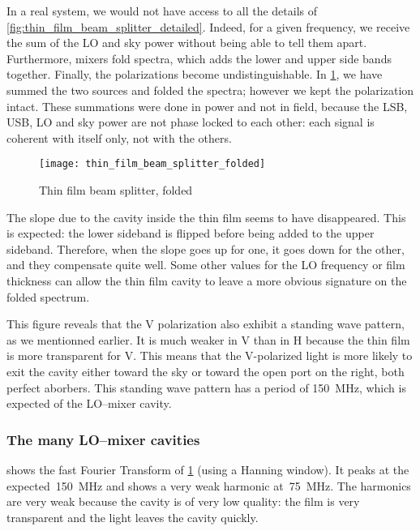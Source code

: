 In a real system, we would not have access to all the details of \cref{fig:thin_film_beam_splitter_detailed}.
Indeed, for a given frequency, we receive the sum of the LO and sky power without being able to tell them apart.
Furthermore, mixers fold spectra, which adds the lower and upper side bands together.
Finally, the polarizations become undistinguishable.
In \cref{fig:thin_film_beam_splitter_folded}, we have summed the two sources and folded the spectra; however we kept the polarization intact.
These summations were done in power and not in field, because the LSB, USB, LO and sky power are not phase locked to each other: each signal is coherent with itself only, not with the others.

\begin{figure}[hbtp]
    \centering
    \texttt{[image: thin\_film\_beam\_splitter\_folded]}
    \caption{Thin film beam splitter, folded}
    \label{fig:thin_film_beam_splitter_folded}
\end{figure}

The slope due to the cavity inside the thin film seems to have disappeared.
This is expected: the lower sideband is flipped before being added to the upper sideband.
Therefore, when the slope goes up for one, it goes down for the other,
and they compensate quite well.
Some other values for the LO frequency or film thickness can allow the thin film cavity to leave a more obvious signature on the folded spectrum.

This figure reveals that the V polarization also exhibit a standing wave pattern, as we mentionned earlier.
It is much weaker in V than in H because the thin film is more transparent for V.
This means that the V-polarized light is more likely to exit the cavity either toward the sky or toward the open port on the right, both perfect aborbers.
This standing wave pattern has a period of \SI{150}{\mega\hertz}, which is expected of the LO--mixer cavity.

\subsubsection{The many LO--mixer cavities}

 shows
the fast Fourier Transform of \cref{fig:thin_film_beam_splitter_folded} (using a Hanning window).
It peaks at the expected~\SI{150}{\mega\hertz} and shows a very weak harmonic at~\SI{75}{\mega\hertz}.
The harmonics are very weak because the cavity is of very low quality: the film is very transparent and the light leaves the cavity quickly.

